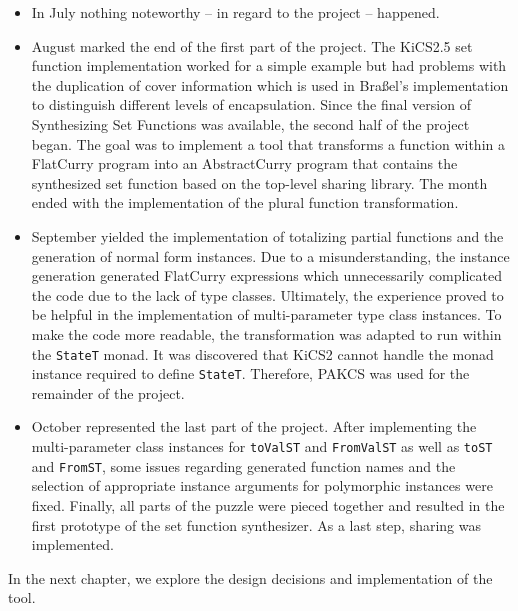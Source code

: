 \documentclass[a4paper, 11pt, fleqn]{scrreprt}
\newcommand{\cinline}[1]{\texttt{#1}}
\begin{document}
\begin{itemize}
    \item In July nothing noteworthy -- in regard to the project -- happened.
    \item August marked the end of the first part of the project. The KiCS2.5 set function implementation worked for a simple example but had problems with the duplication of cover information which is used in Braßel's implementation to distinguish different levels of encapsulation. Since the final version of Synthesizing Set Functions was available, the second half of the project began. The goal was to implement a tool that transforms a function within a FlatCurry program into an AbstractCurry program that contains the synthesized set function based on the top-level sharing library. The month ended with the implementation of the plural function transformation.
    \item September yielded the implementation of totalizing partial functions and the generation of normal form instances. Due to a misunderstanding, the instance generation generated FlatCurry expressions which unnecessarily complicated the code due to the lack of type classes. Ultimately, the experience proved to be helpful in the implementation of  multi-parameter type class instances. To make the code more readable, the transformation was adapted to run within the \cinline{StateT} monad. It was discovered that KiCS2 cannot handle the monad instance required to define \cinline{StateT}.  Therefore, PAKCS was used for the remainder of the project.
    \item October represented the last part of the project. After implementing the multi-parameter class instances for \cinline{toValST} and \cinline{FromValST} as well as \cinline{toST} and \cinline{FromST}, some issues regarding generated function names and the selection of appropriate instance arguments for polymorphic instances were fixed. Finally, all parts of the puzzle were pieced together and resulted in the first prototype of the set function synthesizer. As a last step, sharing was implemented. 
\end{itemize}
In the next chapter, we explore the design decisions and implementation of the tool.
\end{document}
